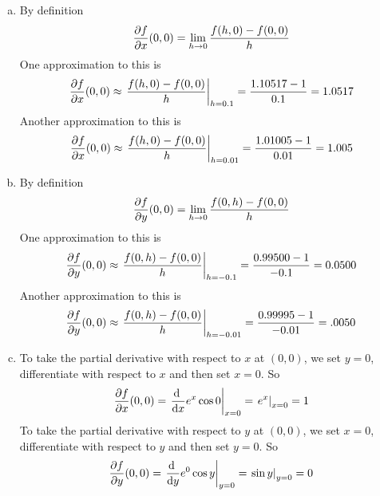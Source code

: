 \begin{solution}
\begin{enumerate}[(a)]
\item
By definition
\begin{equation*}
\pdiff{f}{x}(0,0)
=\lim_{h\rightarrow 0}\frac{f(h,0)-f(0,0)}{h}
\end{equation*}
One approximation to this is
\begin{align*}
\pdiff{f}{x}(0,0)
\approx \left.\frac{f(h,0)-f(0,0)}{h}\right|_{h=0.1}
=\frac{1.10517-1}{0.1}
=1.0517
\end{align*}
Another approximation to this is
\begin{align*}
\pdiff{f}{x}(0,0)
\approx \left.\frac{f(h,0)-f(0,0)}{h}\right|_{h=0.01}
=\frac{1.01005-1}{0.01}
=1.005
\end{align*}
\item
By definition
\begin{equation*}
\pdiff{f}{y}(0,0)
=\lim_{h\rightarrow 0}\frac{f(0,h)-f(0,0)}{h}
\end{equation*}
One approximation to this is
\begin{align*}
\pdiff{f}{y}(0,0)
\approx \left.\frac{f(0,h)-f(0,0)}{h}\right|_{h=-0.1}
=\frac{0.99500-1}{-0.1}
=0.0500
\end{align*}
Another approximation to this is
\begin{align*}
\pdiff{f}{y}(0,0)
\approx \left.\frac{f(0,h)-f(0,0)}{h}\right|_{h=-0.01}
=\frac{0.99995-1}{-0.01}
=.0050
\end{align*}
\item
To take the partial derivative with respect to $x$ at $(0,0)$,
we set $y=0$, differentiate with respect to $x$ and then set $x=0$. So
\begin{align*}
\pdiff{f}{x}(0,0) = \left.\diff{}{x} e^x\cos 0\right|_{x=0}
=\left.e^x\right|_{x=0}=1
\end{align*}
To take the partial derivative with respect to $y$ at $(0,0)$,
we set $x=0$, differentiate with respect to $y$ and then set $y=0$. So
\begin{align*}
\pdiff{f}{y}(0,0) = \left.\diff{}{y} e^0\cos y\right|_{y=0}
=\left.\sin y\right|_{y=0}
=0
\end{align*}
\end{enumerate}
\end{solution}

